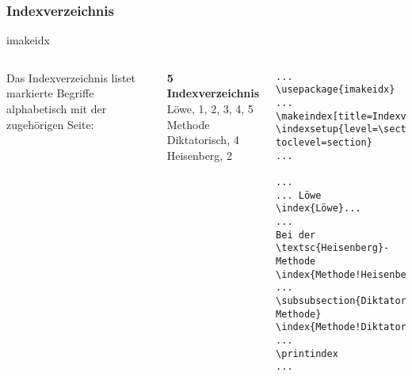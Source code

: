 \subsubsection{Indexverzeichnis}
\begin{frame}[fragile]{imakeidx}

\begin{columns}[c]

    Das Indexverzeichnis listet markierte Begriffe alphabetisch mit der zugehörigen 
Seite:
\vspace{\baselineskip}\linebreak

    \begin{outputbox}
{ \large\textbf{5 Indexverzeichnis}}
\vspace{\baselineskip}\linebreak
Löwe, 1, 2, 3, 4, 5
\vspace{\baselineskip}\linebreak
Methode \\
\hspace{3ex}Diktatorisch, 4 \\
\hspace{3ex}Heisenberg, 2
\end{outputbox}



\begin{lstlisting}[]
...
\usepackage{imakeidx}
...
\makeindex[title=Indexverzeichnis]
\indexsetup{level=\section, toclevel=section}
...

...
... Löwe \index{Löwe}...
...
Bei der \textsc{Heisenberg}-Methode \index{Methode!Heisenberg}...
...
\subsubsection{Diktatorische Methode} \index{Methode!Diktatorisch}
...
\printindex
...

\end{lstlisting}

    
  \end{columns}


\end{frame}


